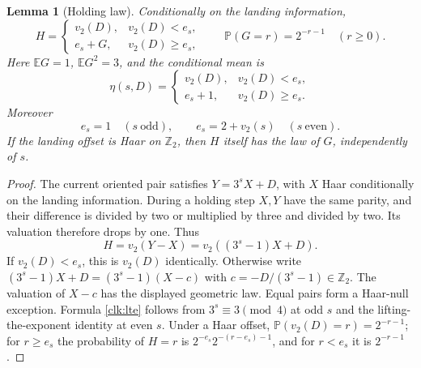 \documentclass[11pt]{amsart}
\newtheorem{lemma}[theorem]{Lemma}
\theoremstyle{definition}
\theoremstyle{remark}
\newcommand{\E}{\mathbb E}
\newcommand{\PP}{\mathbb P}
\newcommand{\Ztwo}{\mathbb Z_2}
\begin{document}
\begin{lemma}[Holding law]\label{clk:holding}
Conditionally on the landing information,
\begin{equation}\label{clk:holding-law}
 H=\begin{cases}
 v_2(D),&v_2(D)<e_s,\\
 e_s+G,&v_2(D)\ge e_s,
 \end{cases}
 \qquad \PP(G=r)=2^{-r-1}\quad(r\ge0).
\end{equation}
Here $\E G=1$, $\E G^2=3$, and the conditional mean is
\begin{equation}\label{clk:eta}
 \eta(s,D)=\begin{cases}v_2(D),&v_2(D)<e_s,\\e_s+1,&v_2(D)\ge e_s.
 \end{cases}
\end{equation}
Moreover
\begin{equation}\label{clk:lte}
 e_s=1\quad(s\ \text{odd}),\qquad e_s=2+v_2(s)\quad(s\ \text{even}).
\end{equation}
If the landing offset is Haar on $\Ztwo$, then $H$ itself has the law of
$G$, independently of $s$.
\end{lemma}
\begin{proof}
The current oriented pair satisfies $Y=3^sX+D$, with $X$ Haar
conditionally on the landing information. During a holding step $X,Y$
have the same parity, and their difference is divided by two or multiplied
by three and divided by two. Its valuation therefore drops by one. Thus
\[
 H=v_2(Y-X)=v_2((3^s-1)X+D).
\]
If $v_2(D)<e_s$, this is $v_2(D)$ identically. Otherwise write
$(3^s-1)X+D=(3^s-1)(X-c)$ with
$c=-D/(3^s-1)\in\Ztwo$. The valuation of $X-c$ has the displayed
geometric law. Equal pairs form a Haar-null exception. Formula
\eqref{clk:lte} follows from $3^s\equiv3\pmod4$ at odd $s$ and
the lifting-the-exponent identity at even $s$. Under a Haar offset,
$\PP(v_2(D)=r)=2^{-r-1}$; for $r\ge e_s$ the probability of $H=r$
is $2^{-e_s}2^{-(r-e_s)-1}$, and for $r<e_s$ it is $2^{-r-1}$.
\end{proof}
\end{document}
